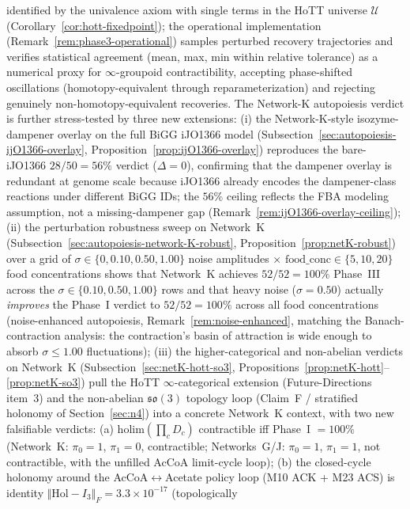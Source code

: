 \documentclass[11pt,a4paper]{article}
\theoremstyle{plain}
\theoremstyle{definition}
\theoremstyle{remark}
\newcommand{\so}{\mathfrak{so}}
\newcommand{\normF}[1]{\mathopen{}\Vert#1\mathclose{}\Vert_{\!F}}
\begin{document}
identified by the univalence axiom with single terms in the HoTT
universe $\mathcal{U}$ (Corollary~\ref{cor:hott-fixedpoint}); the
operational implementation (Remark~\ref{rem:phase3-operational})
samples perturbed recovery trajectories and verifies statistical
agreement (mean, max, min within relative tolerance) as a numerical
proxy for $\infty$-groupoid contractibility, accepting phase-shifted
oscillations (homotopy-equivalent through reparameterization) and
rejecting genuinely non-homotopy-equivalent recoveries.
The Network-K autopoiesis verdict is further stress-tested by three
new extensions: (i) the Network-K-style isozyme-dampener overlay on
the full BiGG iJO1366 model
(Subsection~\ref{sec:autopoiesis-ijO1366-overlay},
Proposition~\ref{prop:ijO1366-overlay}) reproduces the bare-iJO1366
$28/50 = 56\%$ verdict ($\Delta = 0$), confirming that the dampener
overlay is redundant at genome scale because iJO1366 already encodes
the dampener-class reactions under different BiGG IDs; the $56\%$
ceiling reflects the FBA modeling assumption, not a missing-dampener
gap (Remark~\ref{rem:ijO1366-overlay-ceiling}); (ii) the perturbation
robustness sweep on Network~K
(Subsection~\ref{sec:autopoiesis-network-K-robust},
Proposition~\ref{prop:netK-robust}) over a grid of $\sigma \in \{0,
0.10, 0.50, 1.00\}$ noise amplitudes $\times$ $\mathrm{food\_conc} \in
\{5, 10, 20\}$ food concentrations shows that Network~K achieves
$52/52 = 100\%$ Phase~III across the $\sigma \in \{0.10, 0.50, 1.00\}$
rows and that heavy noise ($\sigma = 0.50$) actually \emph{improves}
the Phase~I verdict to $52/52 = 100\%$ across all food concentrations
(noise-enhanced autopoiesis, Remark~\ref{rem:noise-enhanced},
matching the Banach-contraction analysis: the contraction's basin of
attraction is wide enough to absorb $\sigma \leq 1.00$ fluctuations);
(iii) the higher-categorical and non-abelian verdicts on Network~K
(Subsection~\ref{sec:netK-hott-so3},
Propositions~\ref{prop:netK-hott}--\ref{prop:netK-so3}) pull the HoTT
$\infty$-categorical extension (Future-Directions item~3) and the
non-abelian $\so(3)$ topology loop (Claim~F / stratified holonomy of
Section~\ref{sec:n4}) into a concrete Network~K context, with two new
falsifiable verdicts: (a) $\mathrm{holim}(\prod_c D_c)$ contractible
iff Phase~I $= 100\%$ (Network~K: $\pi_0 = 1$, $\pi_1 = 0$,
contractible; Networks~G/J: $\pi_0 = 1$, $\pi_1 = 1$, not
contractible, with the unfilled AcCoA limit-cycle loop); (b) the
closed-cycle holonomy around the AcCoA$\leftrightarrow$Acetate policy
loop (M10 ACK + M23 ACS) is identity
$\normF{\mathrm{Hol} - I_3} = 3.3 \times 10^{-17}$ (topologically
\end{document}
